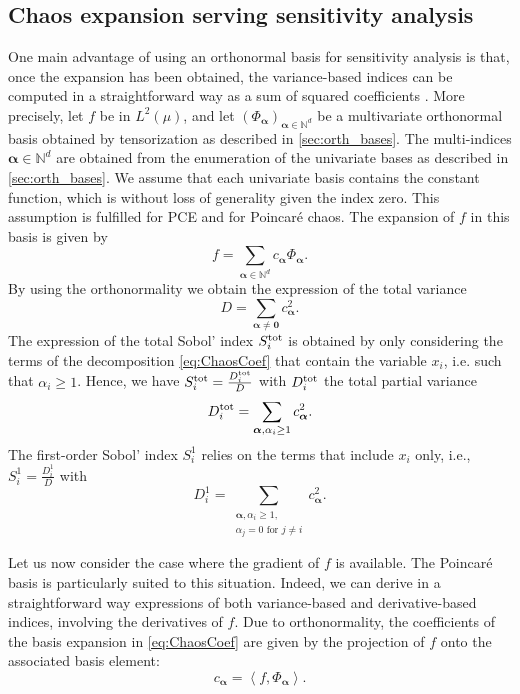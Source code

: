\documentclass[a4paper,11pt]{article}
\newcommand{\Nn}{\mathbb{N}}
\newcommand{\ve}[1]{\boldsymbol{#1}}
\newcommand{\innprod}[2]{\left\langle #1, #2 \right\rangle}
\newcommand{\alp}{{\ve{\alpha}}}
\newcommand{\Phal}{\Phi_{\alp}}
\renewcommand{\citep}[2][]{\cite[#1]{#2}}
\theoremstyle{definition}
\theoremstyle{remark}
\theoremstyle{theorem}
\begin{document}
\subsection{Chaos expansion serving  sensitivity analysis}
One main advantage of using an orthonormal basis for sensitivity analysis is that, once the expansion has been obtained, the variance-based indices can be computed in a straightforward way as a sum of squared coefficients \citep{SudretCSM2006, sud08}. More precisely, let $f$ be in $L^2(\mu)$, and let $(\Phal)_{\alp\in \Nn^d}$ be a multivariate orthonormal basis obtained by tensorization as described in \cref{sec:orth_bases}.
The multi-indices $\alp \in \Nn^d$ are obtained from the enumeration of the univariate bases as described in \cref{sec:orth_bases}. We assume that each univariate basis contains the constant function, which is without loss of generality given the index zero. This assumption is fulfilled for PCE and for Poincar\'e chaos.
The expansion of $f$ in this basis is given by
\begin{equation} \label{eq:ChaosCoef}
f = \sum_{\alp \in \Nn^d} c_\alp \Phal.
\end{equation}
By using the orthonormality we obtain the expression of the total variance
\begin{equation} \label{eq:VarWithChaos}
D = \sum_{\alp \neq \mathbf{0}} c_\alp^2.
\end{equation}
The expression of the total Sobol' index $S_i^{\rm{tot}}$ is obtained by only considering the terms of the decomposition \eqref{eq:ChaosCoef} that contain the variable $x_i$, i.e. such that $\alpha_i \geq 1$. Hence, we have
$S_i^{\rm{tot}} = \frac{D_i^{\rm{tot}}}{D}$ with $D_i^{\rm{tot}}$ the total partial variance
\begin{equation} \label{eq:VarTotWithChaos}
D_i^{\rm{tot}} = \sum_{\alp, \alpha_i \geq 1} c_\alp^2.
\end{equation}
The first-order Sobol' index $S_i^1$ relies on the terms that include $x_i$ only, i.e., $S_i^{1} = \frac{D_i^{1}}{D}$ with
\begin{equation} \label{eq:VarFirstWithChaos}
D_i^{1} = \sum_{\substack{\alp, \alpha_i \geq 1, \\ \alpha_j = 0 \text{ for }j\neq i}} c_\alp^2.
\end{equation}



Let us now consider the case where the gradient of $f$ is available. The Poincar\'e basis is particularly suited to this situation. Indeed, we can derive in a straightforward way expressions of both variance-based and derivative-based indices, involving the derivatives of $f$.
Due to orthonormality, the coefficients of the basis expansion in \eqref{eq:ChaosCoef} are given by the projection of $f$ onto the associated basis element:
\begin{equation}
\label{eq:coeff}
c_\alp = \innprod{f}{\Phal}.
\end{equation}
\end{document}
